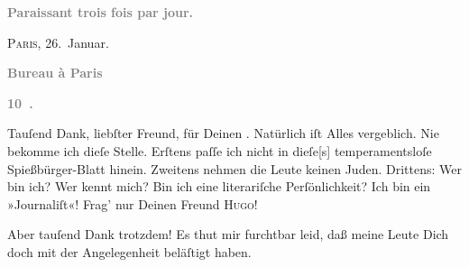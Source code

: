 \pstart
           \begin{otherlanguage}{french}\textcolor{gray}{\textbf{\textbf{Paraissant trois fois par jour.}}}\end{otherlanguage}\hfill \textsc{Paris}, 26. Januar.\pend
           
\pstart
           \begin{otherlanguage}{french}\textcolor{gray}{\textbf{\textbf{Bureau à Paris}}}\end{otherlanguage}\pend
           
\pstart
           \begin{otherlanguage}{french}\textcolor{gray}{\textbf{\textbf{10 .}}}\end{otherlanguage}\pend
           \vspace{0.5em}
\pstart
           Tauſend Dank, liebſter Freund, für Deinen \label{K_L02837-1v}\label{K_L02837-1}. Natürlich iſt Alles vergeblich. Nie bekomme ich dieſe Stelle. Erſtens paſſe ich nicht in
                  dieſe{[}s{]} temperamentsloſe Spießbürger-Blatt hinein. Zweitens nehmen die Leute keinen
               Juden. Drittens: Wer bin ich? Wer kennt mich? Bin ich eine literariſche
               Perſönlichkeit? Ich bin ein »Journaliſt«! Frag’ nur Deinen Freund \textsc{Hugo}!\pend
           
\pstart
           Aber tauſend Dank trotzdem! Es thut mir furchtbar leid, daß meine Leute Dich doch {\pb}mit der Angelegenheit beläſtigt haben.\pend
           
